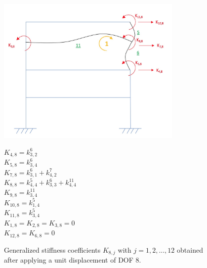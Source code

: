 \documentclass[11pt,a4paper,titlepage]{report}
\begin{document}
\begin{figure} [h]
\begin{minipage}{0.59\linewidth}
        \centering
         \includegraphics[width=9cm]{U=8.jpeg}
\end{minipage}
\begin{minipage}{0.4\linewidth}
\begin{small}
    $K_{4,8} = k^6_{3,2}$\\
    $K_{5,8} = k^6_{3,4}$\\
    $K_{7,8} = k^6_{3,1}+k^7_{4,2}$\\
    $K_{8,8} = k^5_{4,4}+k^6_{3,3}+k^{11}_{4,4}$\\
    $K_{9,8} = k^{11}_{3,4}$\\
    $K_{10,8} = k^5_{1,4}$\\
    $K_{11,8} = k^5_{3,4}$\\
    $K_{1,8} = K_{2,8} = K_{3,8} = 0$\\
    $K_{12,8} = K_{6,8} = 0$\\
\end{small}
\end{minipage}
\caption{Generalized stiffness coefficients $K_{8,j}$ with $j=1,2,...,12$ obtained after applying a unit displacement of DOF 8.}
\label{fig: I.1 - u8=1}
\end{figure}
\newpage
\end{document}
